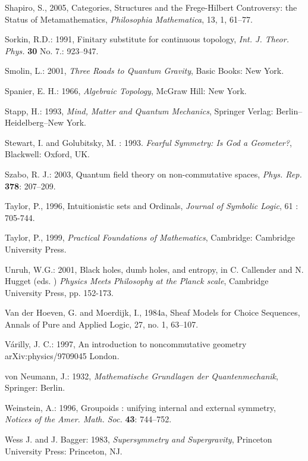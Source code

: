 \documentclass[12pt]{article}
\theoremstyle{plain}
\theoremstyle{definition}
\numberwithin{equation}{section}
\begin{document}
\begin{thebibliography}{99}
Shapiro, S., 2005, Categories, Structures and the Frege-Hilbert Controversy: the Status of Metamathematics, 
\emph{Philosophia Mathematica}, 13, 1, 61--77.

Sorkin, R.D.: 1991, Finitary substitute for continuous topology,
\emph{Int. J. Theor. Phys.} \textbf{30} No. 7.: 923--947.

Smolin, L.: 2001, \emph{Three Roads to Quantum Gravity}, Basic Books: New York.

Spanier, E. H.: 1966, \emph{Algebraic Topology}, McGraw Hill: New York.

Stapp, H.: 1993, \emph{Mind, Matter and Quantum Mechanics},
Springer Verlag: Berlin--Heidelberg--New York.

Stewart, I. and Golubitsky, M. : 1993. \emph{Fearful Symmetry: Is God a Geometer?}, Blackwell: Oxford, UK.

Szabo, R. J.: 2003, Quantum field theory on non-commutative spaces,
\emph{Phys. Rep.} \textbf{378}: 207--209.

Taylor, P., 1996, Intuitionistic sets and Ordinals, \emph{Journal of Symbolic Logic}, 61 : 705-744.
 
Taylor, P., 1999, \emph{Practical Foundations of Mathematics}, Cambridge: Cambridge University Press. 

Unruh, W.G.: 2001, Black holes, dumb holes, and entropy, in C. Callender and N. Hugget (eds. ) \emph{Physics Meets Philosophy at the Planck scale}, Cambridge University Press, pp. 152-173.

Van der Hoeven, G. and Moerdijk, I., 1984a, Sheaf Models for Choice Sequences, Annals of Pure and Applied Logic, 27, no. 1, 63--107. 

V\'arilly, J. C.: 1997, An introduction to noncommutative geometry \\ arXiv:physics/9709045
London.

von Neumann, J.: 1932, \emph{Mathematische Grundlagen der Quantenmechanik}, Springer: Berlin.

Weinstein, A.: 1996, Groupoids : unifying internal and external symmetry, \emph{Notices of the Amer. Math. Soc.} \textbf{43}: 744--752.

Wess J. and J. Bagger: 1983, \emph{Supersymmetry and Supergravity}, Princeton University Press: Princeton, NJ.


\end{thebibliography}
\end{document}
